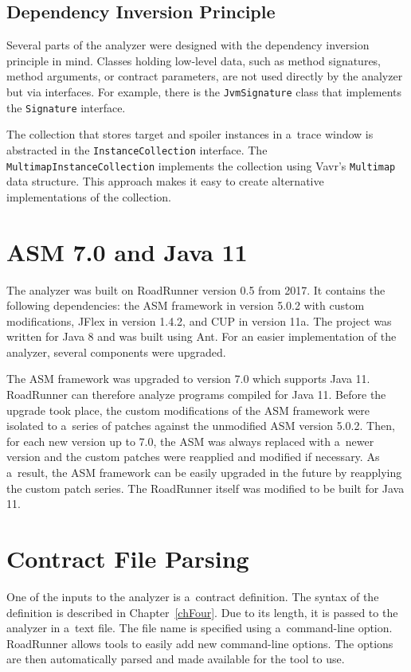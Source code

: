 \subsection{Dependency Inversion Principle}
Several parts of the analyzer were designed with the dependency inversion
principle in mind. Classes holding low-level data, such as method signatures,
method arguments, or contract parameters, are not used directly by the analyzer
but via interfaces. For example, there is the \texttt{JvmSignature} class that
implements the \texttt{Signature} interface.

The collection that stores target and spoiler instances in a~trace window is
abstracted in the \texttt{InstanceCollection} interface. The
\texttt{MultimapInstanceCollection} implements the collection using Vavr's
\texttt{Multimap} data structure. This approach makes it easy to create
alternative implementations of the collection.

\section{ASM 7.0 and Java 11}
\label{asmAndJava}
The analyzer was built on RoadRunner version 0.5 from 2017. It contains the
following dependencies: the ASM framework in version 5.0.2 with custom
modifications, JFlex in version 1.4.2, and CUP in version 11a. The project was
written for Java 8 and was built using Ant. For an easier implementation of the
analyzer, several components were upgraded.

The ASM framework was upgraded to version 7.0 which supports Java 11. RoadRunner
can therefore analyze programs compiled for Java 11. Before the upgrade took
place, the custom modifications of the ASM framework were isolated to a~series
of patches against the unmodified ASM version 5.0.2. Then, for each new version
up to 7.0, the ASM was always replaced with a~newer version and the custom
patches were reapplied and modified if necessary. As a~result, the ASM framework
can be easily upgraded in the future by reapplying the custom patch series. The
RoadRunner itself was modified to be built for Java 11.

\section{Contract File Parsing}
\label{cfParsing}
One of the inputs to the analyzer is a~contract definition. The syntax of the
definition is described in Chapter~\ref{chFour}. Due to its length, it is passed
to the analyzer in a~text file. The file name is specified using a~command-line
option. RoadRunner allows tools to easily add new command-line options. The
options are then automatically parsed and made available for the tool to use.

